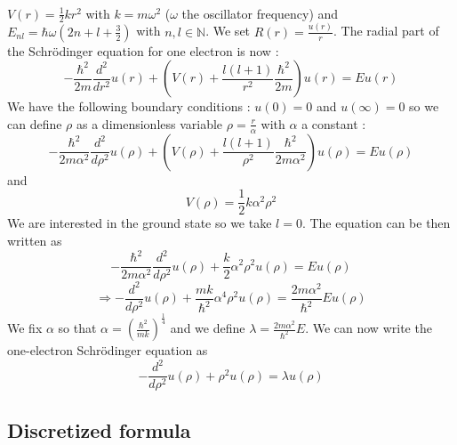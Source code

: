 \documentclass[a4paper, twoside, 11pt]{report}
\theoremstyle{theorem}
\theoremstyle{remark}
\theoremstyle{exemple}
\newcommand{\N}{\mathbb{N}}
\begin{document}
    		\paragraph{}$V(r) = \frac{1}{2} k r^2$ with $k=m\omega^2$ ($\omega$ the oscillator frequency) and $E_{nl} = \hbar \omega(2n+l+\frac{3}{2})$ with $n,l \in \N$. We set $R(r)=\frac{u(r)}{r}$. The radial part of the Schrödinger equation for one electron is now :
        \begin{equation}
             -\frac{\hbar^2}{2 m} \frac{d^2}{dr^2} u(r)  + \left ( V(r) + \frac{l (l + 1)}{r^2}\frac{\hbar^2}{2 m} \right ) u(r)  = E u(r)
             \tag{1}
        \end{equation}
    We have the following boundary conditions : $u(0)=0$ and $u(\infty)=0$ so we can define $\rho$ as a dimensionless variable $\rho = \frac{r}{\alpha}$ with $\alpha$ a constant :
        \begin{equation*}
            -\frac{\hbar^2}{2 m \alpha^2} \frac{d^2}{d\rho^2} u(\rho) + \left ( V(\rho) + \frac{l (l + 1)}{\rho^2} \frac{\hbar^2}{2 m\alpha^2} \right ) u(\rho)  = E u(\rho)
        \end{equation*}
    and 
        \begin{equation*}
            V(\rho) = \frac{1}{2}k\alpha^2\rho^2
        \end{equation*}
    We are interested in the ground state so we take $l=0$. The equation can be then written as 
        \begin{equation*}
             -\frac{\hbar^2}{2 m \alpha^2} \frac{d^2}{d\rho^2} u(\rho) + \frac{k}{2} \alpha^2\rho^2u(\rho)  = E u(\rho)
        \end{equation*}
        \begin{equation*}      
            \Longrightarrow   -\frac{d^2}{d\rho^2} u(\rho) + \frac{mk}{\hbar^2} \alpha^4\rho^2u(\rho)  = \frac{2m\alpha^2}{\hbar^2}E u(\rho)
        \end{equation*}
    We fix $\alpha$ so that $\alpha = \left(\frac{\hbar^2}{mk}\right)^{\frac{1}{4}}$ and we define $\lambda=\frac{2m\alpha^2}{\hbar^2}E$. 
    We can now write the one-electron Schrödinger equation as 
        \begin{equation}
            -\frac{d^2}{d\rho^2} u(\rho) + \rho^2u(\rho)  = \lambda u(\rho)
            \tag{2}
        \end{equation}
        
        
        \subsection{Discretized formula}
\end{document}
